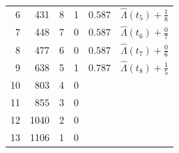 \begin{question}{}
{\begin{center}
\begin{tabular}{rrrrll}
  6 & 431 & 8 & 1 & $0.587$ & $\hat{\Lambda}(t_5) + \frac{1}{8}$ \\
  7 & 448 & 7 & 0 & $0.587$ & $\hat{\Lambda}(t_6) + \frac{0}{7}$ \\
  8 & 477 & 6 & 0 & $0.587$ & $\hat{\Lambda}(t_7) + \frac{0}{6}$ \\
  9 & 638 & 5 & 1 & $0.787$ & $\hat{\Lambda}(t_8) + \frac{1}{5}$ \\[2mm]
  10 & 803 & 4 & 0 & \\[2mm] %
  11 & 855 & 3 & 0 & \\[2mm] %
  12 & 1040 & 2 & 0 & \\[2mm] %
  13 & 1106 & 1 & 0 & \\[2mm] %
  \bottomrule
\end{tabular}
\end{center}
}
\end{question}

\newpage

